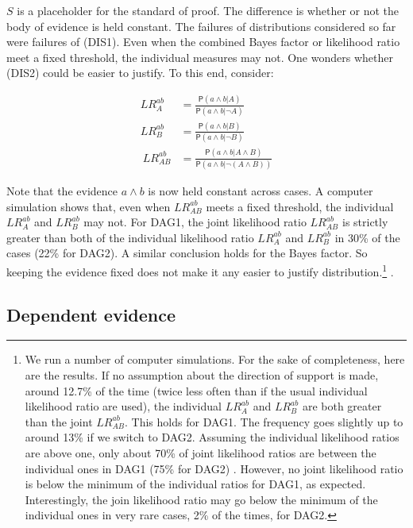 \documentclass[
  10pt,
  dvipsnames,enabledeprecatedfontcommands]{scrartcl}
\newcommand{\pr}[1]{\ensuremath{\mathsf{P}(#1)}}
\begin{document}
\noindent \(S\) is a placeholder for the standard of proof. The
difference is whether or not the body of evidence is held constant. The
failures of distributions considered so far were failures of (DIS1).
Even when the combined Bayes factor or likelihood ratio meet a fixed
threshold, the individual measures may not. One wonders whether (DIS2)
could be easier to justify. To this end, consider:

\begin{align*}
LR_A^{ab}  & =  \frac{\pr{a \wedge b \vert A}}{\pr{a \wedge b \vert \neg A}}\\
LR_B^{ab} & = \frac{\pr{a \wedge b \vert B}}{\pr{a \wedge b \vert \neg B}}\\\
LR_{AB}^{ab}  & =  \frac{\pr{a\wedge b \vert A \wedge B}}{\pr{a \wedge b \vert \neg (A \wedge B)}}
\end{align*}

\noindent Note that the evidence \(a\wedge b\) is now held constant
across cases. A computer simulation shows that, even when
\(LR_{AB}^{ab}\) meets a fixed threshold, the individual \(LR_A^{ab}\)
and \(LR_B^{ab}\) may not. For \textsf{DAG1}, the joint likelihood ratio
\(LR_{AB}^{ab}\) is strictly greater than both of the individual
likelihood ratio \(LR_{A}^{ab}\) and \(LR_{B}^{ab}\) in 30\% of the
cases (22\% for \textsf{DAG2}). A similar conclusion holds for the Bayes
factor. So keeping the evidence fixed does not make it any easier to
justify distribution.\footnote{We run a number of computer simulations.
  For the sake of completeness, here are the results. If no assumption
  about the direction of support is made, around 12.7\% of the time
  (twice less often than if the usual individual likelihood ratio are
  used), the individual \(LR_A^{ab}\) and \(LR_B^{ab}\) are both greater
  than the joint \(LR_{AB}^{ab}\). This holds for \textsf{DAG1}. The
  frequency goes slightly up to around 13\% if we switch to
  \textsf{DAG2}. Assuming the individual likelihood ratios are above
  one, only about 70\% of joint likelihood ratios are between the
  individual ones in \textsf{DAG1} (75\% for \textsf{DAG2}) . However,
  no joint likelihood ratio is below the minimum of the individual
  ratios for \textsf{DAG1}, as expected. Interestingly, the join
  likelihood ratio may go below the minimum of the individual ones in
  very rare cases, 2\% of the times, for \textsf{DAG2}.} .

\hypertarget{dependent-evidence}{%
\subsection*{Dependent evidence}\label{dependent-evidence}}
\end{document}
